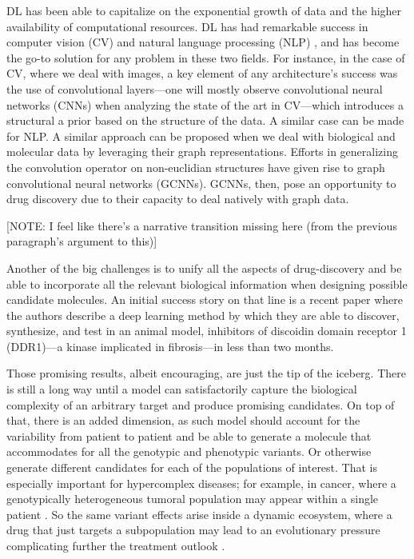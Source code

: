 \documentclass{article}
\begin{document}
DL has been able to capitalize on the exponential growth of data and the higher
 availability of computational resources. DL has had remarkable success in computer
 vision (CV) \cite{Guo2016} and natural language processing (NLP) \cite{Young2018}, and
 has become the go-to solution for any problem in these two fields. For instance, in the
 case of CV, where we deal with images, a key element of any architecture's success was
 the use of convolutional layers---one will mostly observe convolutional neural networks
 (CNNs) when analyzing the state of the art in CV---which introduces a structural a
 prior based on the structure of the data\cite{Fukushima1980, LeCun1989, Ulyanov}. A
 similar case can be made for NLP. A similar approach can be proposed when we deal with
 biological and molecular data by leveraging their graph representations. Efforts in
 generalizing the convolution operator on non-euclidian structures have given rise to
 graph convolutional neural networks (GCNNs)\cite{Wu2019}. GCNNs, then, pose an
 opportunity to drug discovery due to their capacity to deal natively with graph
 data\cite{Sun2019}.

{\color{red} [NOTE: I feel like there's a narrative transition missing here (from the
previous paragraph's argument to this)]}

{\color{red}Another of the big challenges is to unify all the aspects of drug-discovery
 and be able to incorporate all the relevant biological information when designing
 possible candidate molecules.} An initial success story on that line is a recent paper
 \cite{Zhavoronkov2019} where the authors describe a deep learning method by which they
 are able to discover, synthesize, and test in an animal model, inhibitors of discoidin
 domain receptor 1 (DDR1)—a kinase implicated in fibrosis—in less than two months.

Those promising results, albeit encouraging, are just the tip of the iceberg. There is
 still a long way until a model can satisfactorily capture the biological complexity of
 an arbitrary target and produce promising candidates. On top of that, there is an added
 dimension, as such model should account for the variability from patient to patient and
 be able to generate a molecule that accommodates for all the genotypic and phenotypic
 variants. Or otherwise generate different candidates for each of the populations of
 interest. That is especially important for hypercomplex diseases; for example, in
 cancer, where a genotypically heterogeneous tumoral population may appear within a
 single patient \cite{Boland2017}. So the same variant effects arise inside a dynamic
 ecosystem, where a drug that just targets a subpopulation may lead to an evolutionary
 pressure complicating further the treatment outlook \cite{Enriquez-Navas2015}.
\end{document}
